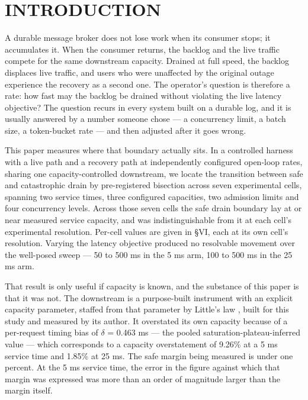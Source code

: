 \documentclass{ieeeaccess}
\begin{document}
\titlepgskip=-15pt
\maketitle

\section{INTRODUCTION}

A durable message broker does not lose work when its consumer stops; it accumulates it. When the consumer returns, the backlog and the live traffic compete for the same downstream capacity. Drained at full speed, the backlog displaces live traffic, and users who were unaffected by the original outage experience the recovery as a second one. The operator's question is therefore a rate: how fast may the backlog be drained without violating the live latency objective? The question recurs in every system built on a durable log, and it is usually answered by a number someone chose --- a concurrency limit, a batch size, a token-bucket rate --- and then adjusted after it goes wrong.

This paper measures where that boundary actually sits. In a controlled harness with a live path and a recovery path at independently configured open-loop rates, sharing one capacity-controlled downstream, we locate the transition between safe and catastrophic drain by pre-registered bisection across seven experimental cells, spanning two service times, three configured capacities, two admission limits and four concurrency levels. Across those seven cells the safe drain boundary lay at or near measured service capacity, and was indistinguishable from it at each cell's experimental resolution. Per-cell values are given in \S{}VI, each at its own cell's resolution. Varying the latency objective produced no resolvable movement over the well-posed sweep --- 50 to 500 ms in the 5 ms arm, 100 to 500 ms in the 25 ms arm.

That result is only useful if capacity is known, and the substance of this paper is that it was not. The downstream is a purpose-built instrument with an explicit capacity parameter, staffed from that parameter by Little's law \cite{little}, built for this study and measured by its author. It overstated its own capacity because of a per-request timing bias of $\delta$ = 0.463 ms --- the pooled saturation-plateau-inferred value --- which corresponds to a capacity overstatement of 9.26\% at a 5 ms service time and 1.85\% at 25 ms. The safe margin being measured is under one percent. At the 5 ms service time, the error in the figure against which that margin was expressed was more than an order of magnitude larger than the margin itself.
\end{document}
